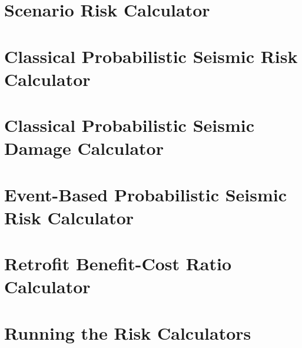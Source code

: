\section{Scenario Risk Calculator}
\label{sec:config_scenario_risk}


\section{Classical Probabilistic Seismic Risk Calculator}
\label{sec:config_classical_risk}


\section{Classical Probabilistic Seismic Damage Calculator}
\label{sec:config_classical_damage}


\section{Event-Based Probabilistic Seismic Risk Calculator}
\label{sec:config_event_based_risk}


\section{Retrofit Benefit-Cost Ratio Calculator}
\label{sec:config_benefit_cost}


\section{Running the Risk Calculators}
\label{sec:running_risk}


\cleardoublepage